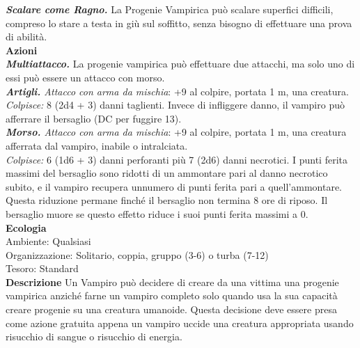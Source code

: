 \begin{multicols}{2}
\emph{\textbf{Scalare come Ragno.}} La Progenie Vampirica può scalare superfici difficili, compreso lo stare a testa in giù sul soffitto, senza bisogno di effettuare una prova di abilità.\\

\smallskip\textbf{Azioni} \\

\emph{\textbf{Multiattacco.}} La progenie vampirica può effettuare due attacchi, ma solo uno di essi può essere un attacco con morso.\\

\emph{\textbf{Artigli.} Attacco con arma da mischia}: +9 al colpire, portata 1 m, una creatura.\\

\emph{Colpisce:} 8 (2d4 + 3) danni taglienti. Invece di infliggere danno, il vampiro può afferrare il bersaglio (DC per fuggire 13).\\

\emph{\textbf{Morso.} Attacco con arma da mischia}: +9 al colpire, portata 1 m, una creatura afferrata dal vampiro, inabile o intralciata.\\

\emph{Colpisce:} 6 (1d6 + 3) danni perforanti più 7 (2d6) danni necrotici. I punti ferita massimi del bersaglio sono ridotti di un ammontare pari al danno necrotico subito, e il vampiro recupera unnumero di punti ferita pari a quell'ammontare. Questa riduzione permane  finché il bersaglio non termina 8 ore di riposo. Il bersaglio muore se  questo effetto riduce i suoi punti ferita massimi a 0.\\
\textbf{Ecologia}\\
Ambiente: Qualsiasi\\
Organizzazione: Solitario, coppia, gruppo (3-6) o turba (7-12)\\
Tesoro: Standard\\
\textbf{Descrizione}
Un Vampiro può decidere di creare da una vittima una progenie vampirica anziché farne un vampiro completo solo quando usa la sua capacità creare progenie su una creatura umanoide. Questa decisione deve essere presa come azione gratuita appena un vampiro uccide una creatura appropriata usando risucchio di sangue o risucchio di energia. \\


\end{multicols}
